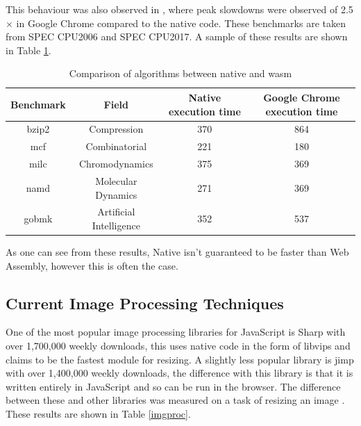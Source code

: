 \documentclass[12pt,a4paper]{article}
\begin{document}
This behaviour was also observed in \cite{jangda2019not}, where peak slowdowns were observed of 2.5$\times$ in Google Chrome compared to the native code. These benchmarks are taken from SPEC CPU2006 and SPEC CPU2017. A sample of these results are shown in Table \ref{native}.
\begin{table}[H]
    \centering
    \caption{Comparison of algorithms between native and wasm}
    \vspace*{6pt}
    \label{native}
    \begin{tabular}{cccc}\hline\hline
        Benchmark & Field                   & Native execution time & Google Chrome execution time \\ \hline
        bzip2     & Compression             & 370                   & 864                          \\
        mcf       & Combinatorial           & 221                   & 180                          \\
        milc      & Chromodynamics          & 375                   & 369                          \\
        namd      & Molecular Dynamics      & 271                   & 369                          \\
        gobmk     & Artificial Intelligence & 352                   & 537
    \end{tabular}
\end{table}

As one can see from these results, Native isn't guaranteed to be faster than Web Assembly, however this is often the case.



\subsection{Current Image Processing Techniques}

One of the most popular image processing libraries for JavaScript is Sharp with over 1,700,000 weekly downloads, this uses native code in the form of libvips and claims to be the fastest module for resizing. A slightly less popular library is jimp with over 1,400,000 weekly downloads, the difference with this library is that it is written entirely in JavaScript and so can be run in the browser. The difference between these and other libraries was measured on a task of resizing an image \cite{sharp}. These results are shown in Table \ref{imgproc}.
\end{document}
